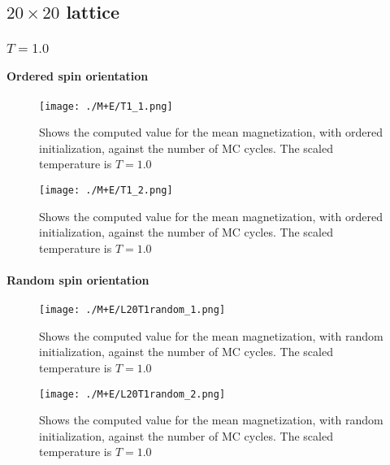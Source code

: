 \documentclass[../main.tex]{subfiles}
\begin{document}
\subsection{$20 \times 20$ lattice}
\subsubsection*{$T=1.0$}
\paragraph*{Ordered spin orientation}

\begin{figure}[!h]
  \texttt{[image: ./M+E/T1\_1.png]}
  \caption{Shows the computed value for the mean magnetization, with ordered initialization, against the number of MC cycles. The scaled temperature is $T=1.0$}
  \label{fig:results-MCplot}
\end{figure}
\FloatBarrier
\begin{figure}[!h]
  \texttt{[image: ./M+E/T1\_2.png]}
  \caption{Shows the computed value for the mean magnetization, with ordered initialization, against the number of MC cycles. The scaled temperature is $T=1.0$}
  \label{fig:results-MCplot}
\end{figure}
\FloatBarrier

\paragraph*{Random spin orientation}

\begin{figure}[!h]
  \texttt{[image: ./M+E/L20T1random\_1.png]}
  \caption{Shows the computed value for the mean magnetization, with random initialization, against the number of MC cycles. The scaled temperature is $T=1.0$}
  \label{fig:results-MCplot}
\end{figure}
\FloatBarrier
\begin{figure}[!h]
  \texttt{[image: ./M+E/L20T1random\_2.png]}
  \caption{Shows the computed value for the mean magnetization, with random initialization, against the number of MC cycles. The scaled temperature is $T=1.0$}
  \label{fig:results-MCplot}
\end{figure}
\FloatBarrier
\end{document}
